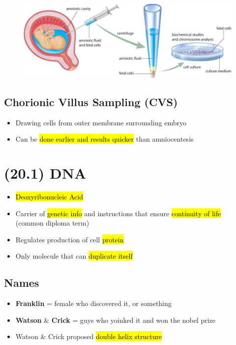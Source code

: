 \documentclass[a4paper,12pt]{article}
\begin{document}
\begin{figure}[H]
    \centering
    \includegraphics[width=\textwidth]{amnio}
\end{figure}

\subsection{Chorionic Villus Sampling (CVS)}
\begin{itemize}
    \item{Drawing cells from outer membrane surrounding embryo}
    \item{Can be \hl{done earlier and results quicker} than amniocentesis}
\end{itemize}

\pagebreak

\section{(20.1) DNA}
\begin{itemize}
    \item{\hl{Deoxyribonucleic Acid}}
    \item{Carrier of \hl{genetic info} and instructions that ensure \hl{continuity of life} \\ (common diploma term)}
    \item{Regulates production of cell \hl{protein}}
    \item{Only molecule that can \hl{duplicate itself}}
\end{itemize}

\subsection{Names}
\begin{itemize}
    \item{\textbf{Franklin} = female who discovered it, or something}
    \item{\textbf{Watson} \& \textbf{Crick} = guys who yoinked it and won the nobel prize}
    \item{Watson \& Crick proposed \hl{double helix structure}}
\end{itemize}
\end{document}
